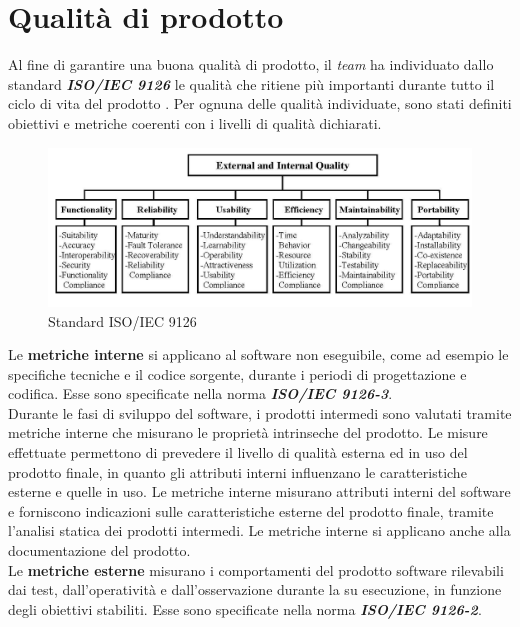 \newpage
\section{Qualità di prodotto}
	
Al fine di garantire una buona qualità di prodotto, il \textit{team} ha individuato dallo standard \textbf{\textit{ISO/IEC 9126}} le qualità che ritiene più importanti durante tutto il ciclo di vita del prodotto \progetto. Per ognuna delle qualità individuate, sono stati definiti obiettivi e metriche coerenti con i livelli di qualità dichiarati.

\begin{figure}[H]
	\centering
	\includegraphics[scale=0.33]{includes/img/9126.png}
	\caption{Standard ISO/IEC 9126}
\end{figure}

Le \textbf{metriche interne} si applicano al software non eseguibile, come ad esempio le specifiche tecniche e il codice sorgente, durante i periodi di progettazione e codifica.
Esse sono specificate nella norma \textbf{\textit{ISO/IEC 9126-3}}.\\
Durante le fasi di sviluppo del software, i prodotti intermedi sono valutati tramite metriche interne che misurano le proprietà intrinseche del prodotto.
Le misure effettuate permettono di prevedere il livello di qualità esterna ed in uso del prodotto finale, in quanto gli attributi interni influenzano le caratteristiche esterne e quelle in uso.
Le metriche interne misurano attributi interni del software e forniscono indicazioni sulle caratteristiche esterne del prodotto finale, tramite l'analisi statica dei prodotti intermedi.
Le metriche interne si applicano anche alla documentazione del prodotto.\\
Le \textbf{metriche esterne} misurano i comportamenti del prodotto software rilevabili dai test, dall'operatività e dall'osservazione durante la su esecuzione, in funzione degli obiettivi stabiliti.
Esse sono specificate nella norma \textbf{\textit{ISO/IEC 9126-2}}.	

